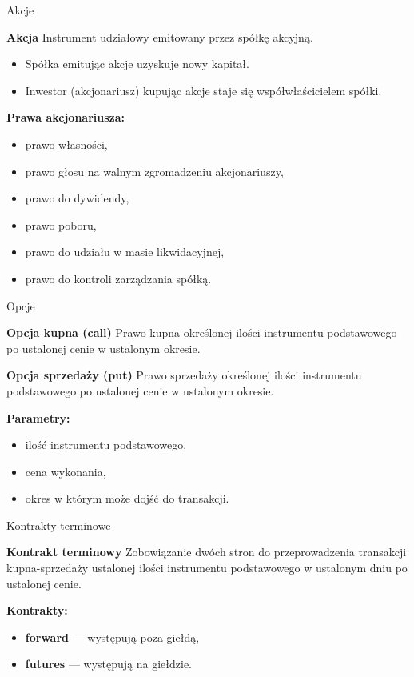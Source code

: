 \documentclass[a4paper, 11pt]{beamer}
\begin{document}
	\begin{frame}{Akcje}
		\begin{block}{\textbf{Akcja}}
			Instrument udziałowy emitowany przez spółkę akcyjną.
			\begin{itemize}
				\item Spółka emitując akcje uzyskuje nowy kapitał.
				\item Inwestor (akcjonariusz) kupując akcje staje się współwłaścicielem spółki.
			\end{itemize}
		\end{block}
		\textbf{Prawa akcjonariusza:}
		\begin{itemize}
			\item prawo własności,
			\item prawo głosu na walnym zgromadzeniu akcjonariuszy,
			\item prawo do dywidendy,
			\item prawo poboru,
			\item prawo do udziału w masie likwidacyjnej,
			\item prawo do kontroli zarządzania spółką.
		\end{itemize}
	\end{frame}
	
	\begin{frame}{Opcje}
		\begin{block}{\textbf{Opcja kupna (call)}}
			Prawo kupna określonej ilości instrumentu podstawowego po ustalonej cenie w ustalonym okresie.
		\end{block}
		\begin{block}{\textbf{Opcja sprzedaży (put)}}
			Prawo sprzedaży określonej ilości instrumentu podstawowego po ustalonej cenie w ustalonym okresie.
		\end{block}
		\textbf{Parametry:}
		\begin{itemize}
			\item ilość instrumentu podstawowego,
			\item cena wykonania,
			\item okres w którym może dojść do transakcji.
		\end{itemize}
	\end{frame}
	
	\begin{frame}{Kontrakty terminowe}
		\begin{block}{\textbf{Kontrakt terminowy}}
			Zobowiązanie dwóch stron do przeprowadzenia transakcji kupna-sprzedaży ustalonej ilości
			instrumentu podstawowego w ustalonym dniu po ustalonej cenie.
		\end{block}
		\textbf{Kontrakty:}
		\begin{itemize}
			\item \textbf{forward} --- występują poza giełdą,
			\item \textbf{futures} --- występują na giełdzie.
		\end{itemize}
	\end{frame}
	
\end{document}
